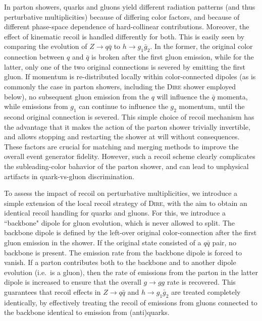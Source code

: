 \documentclass[letterpaper,11pt]{article}
\begin{document}
In parton showers, quarks and gluons yield different radiation patterns (and
thus perturbative multiplicities) because of differing color factors, and
because of different phase-space dependence of hard-collinear contributions.
Moreover, the effect of kinematic recoil is handled differently for both. This
is easily seen by comparing the evolution of $Z\rightarrow q\bar q$ to 
$h\rightarrow g_1\bar g_2$. In the former, the original color connection between $q$ and 
$\bar q$ is broken after the first gluon emission, while for the latter, only
one of the two original connections is severed by emitting the first gluon.
If momentum is re-distributed locally within color-connected dipoles (as
is commonly the case in parton showers, including the \textsc{Dire} shower 
employed below), no subsequent gluon emission from the $q$ will influence 
the $\bar q$ momenta, while emissions from $g_1$ can continue to influence the 
$g_2$ momentum, until the second original connection is severed.
This simple choice of recoil mechanism has the advantage that it makes the action
of the parton shower trivially invertible, and allows stopping and restarting the
shower at will without consequences. These factors are crucial for matching 
and merging methods to improve the overall event generator fidelity. 
However, such a recoil scheme clearly complicates the subleading-color
bahavior of the parton shower, and can lead to unphysical artifacts in 
quark-vs-gluon discrimination. 

To assess the impact of recoil on perturbative multiplicities, we introduce
a simple extension of the local recoil strategy of \textsc{Dire}, with the aim
to obtain an identical recoil handling for quarks and gluons. For this, we 
introduce a ``backbone" dipole for gluon evolution, which is never allowed
to split. The backbone dipole is defined by the left-over original
color-connection after the first gluon emission in the shower. If the
original state consisted of a $q\bar q$ pair, no backbone is present. The
emission rate from the backbone dipole is forced to vanish. If a parton
contributes both to the backbone and to another dipole evolution (i.e.\ is
a gluon), then the rate of emissions from the parton in the latter dipole is 
increased to ensure that the overall $g\rightarrow gg$ rate is recovered.
This guarantees that recoil effects in $Z\rightarrow q\bar q$ and
$h\rightarrow g_1\bar g_2$ are treated completely identically, by effectively
treating the recoil of emissions from gluons connected to the backbone identical
to emission from (anti)quarks.
 
\end{document}
